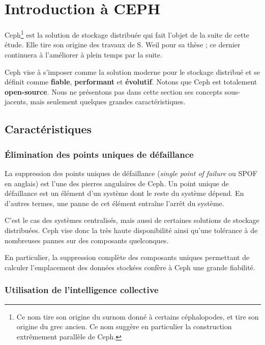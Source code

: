 \section{Introduction à CEPH}
 
Ceph\footnote{Ce nom tire son origine du surnom donné à certains céphalopodes, et tire son origine du grec ancien. Ce nom suggère en particulier la construction extrêmement parallèle de Ceph.} est la solution de stockage distribuée qui fait l'objet de la suite de cette étude. Elle tire son origine des travaux de S. Weil pour sa thèse ; ce dernier continuera à l'améliorer à plein temps par la suite. 

Ceph vise à s'imposer comme la solution moderne pour le stockage distribué et se définit comme \textbf{fiable}, \textbf{performant} et \textbf{évolutif}. Notons que Ceph est totalement \textbf{open-source}. Nous ne présentons pas dans cette section ses concepts sous-jacents, mais seulement quelques grandes caractéristiques.

\subsection{Caractéristiques}

\subsubsection{Élimination des points uniques de défaillance}

La suppression des points uniques de défaillance (\textit{single point of failure} ou SPOF en anglais) est l'une des pierres angulaires de Ceph. Un point unique de défaillance est un élément d'un système dont le reste du système dépend. En d'autres termes, une panne de cet élément entraîne l'arrêt du système.

C'est le cas des systèmes centralisés, mais aussi de certaines solutions de stockage distribuées. Ceph vise donc la très haute disponibilité ainsi qu'une tolérance à de nombreuses pannes sur des composants quelconques.

En particulier, la suppression complète des composants uniques permettant de calculer l'emplacement des données stockées confère à Ceph une grande fiabilité.

\subsubsection{Utilisation de l'intelligence collective}

